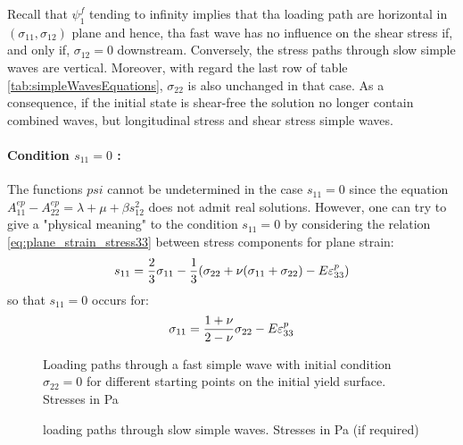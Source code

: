 Recall that $\psi^f_1$ tending to infinity implies that tha loading path are horizontal in $(\sigma_{11},\sigma_{12})$ plane and hence, tha fast wave has no influence on the shear stress if, and only if, $\sigma_{12}=0$ downstream. Conversely, the stress paths through slow simple waves are vertical. Moreover, with regard the last row of table \ref{tab:simpleWavesEquations}, $\sigma_{22}$ is also unchanged in that case. As a consequence, if the initial state is shear-free the solution no longer contain combined waves, but longitudinal stress and shear stress simple waves.

\paragraph*{Condition $s_{11}=0$ :} The functions $psi$ cannot be undetermined in the case $s_{11}=0$ since the equation $A_{11}^{ep}-A_{22}^{ep}=\lambda + \mu + \beta s_{12}^2$ does not admit real solutions.
However, one can try to give a "physical meaning" to the condition $s_{11}=0$ by considering the relation \eqref{eq:plane_strain_stress33} between stress components for plane strain:
\begin{equation*}
  s_{11}= \frac{2}{3}\sigma_{11}-\frac{1}{3}(\sigma_{22}+\nu(\sigma_{11}+\sigma_{22})-E\varepsilon^p_{33})
\end{equation*}
so that $s_{11}=0$ occurs for:
\begin{equation}
  \label{eq:plane_strain_s11=0}
  \sigma_{11}=\frac{1+\nu}{2-\nu}\sigma_{22}-E\varepsilon^p_{33}
\end{equation}

\begin{figure}[h!]
  \centering
  \caption{Loading paths through a fast simple wave with initial condition $\sigma_{22}=0$ for different starting points on the initial yield surface. Stresses in Pa}
  \label{fig:fast_path_plane_strains}
\end{figure}


\begin{figure}[h!]
  \centering
  \caption{loading paths through slow simple waves. Stresses in Pa (if required)}
  \label{fig:slow_path_plane_strains}
\end{figure}

